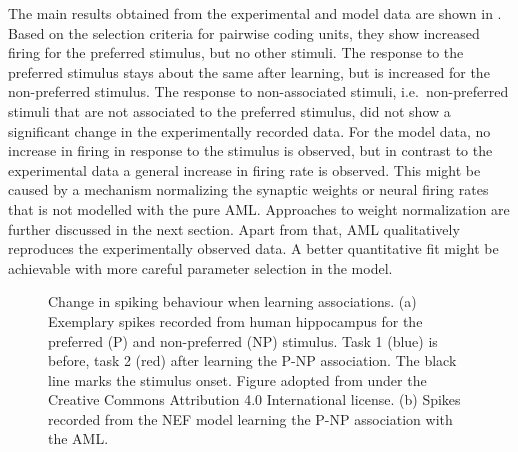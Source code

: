 The main results obtained from the experimental and model data are shown in .
Based on the selection criteria for pairwise coding units, they show increased firing for the preferred stimulus, but no other stimuli.
The response to the preferred stimulus stays about the same after learning, but is increased for the non-preferred stimulus.
The response to non-associated stimuli, i.e.\ non-preferred stimuli that are not associated to the preferred stimulus, did not show a significant change in the experimentally recorded data.
For the model data, no increase in firing in response to the stimulus is observed, but in contrast to the experimental data a general increase in firing rate is observed.
This might be caused by a mechanism normalizing the synaptic weights or neural firing rates that is not modelled with the pure AML\@.
Approaches to weight normalization are further discussed in the next section.
Apart from that, AML qualitatively reproduces the experimentally observed data.
A better quantitative fit might be achievable with more careful parameter selection in the model.
\begin{figure}
    \centering

    \vspace*{0.5cm}
    \caption[Change in spiking behaviour when learning associations]{Change in spiking behaviour when learning associations. (a) Exemplary spikes recorded from human hippocampus for the preferred (P) and non-preferred (NP) stimulus. Task 1 (blue) is before, task 2 (red) after learning the P-NP association. The black line marks the stimulus onset. Figure adopted from \textcite{ison2015} under the Creative Commons Attribution 4.0 International license. (b) Spikes recorded from the NEF model learning the P-NP association with the AML\@.}\label{fig:aml-spikes}
\end{figure}

